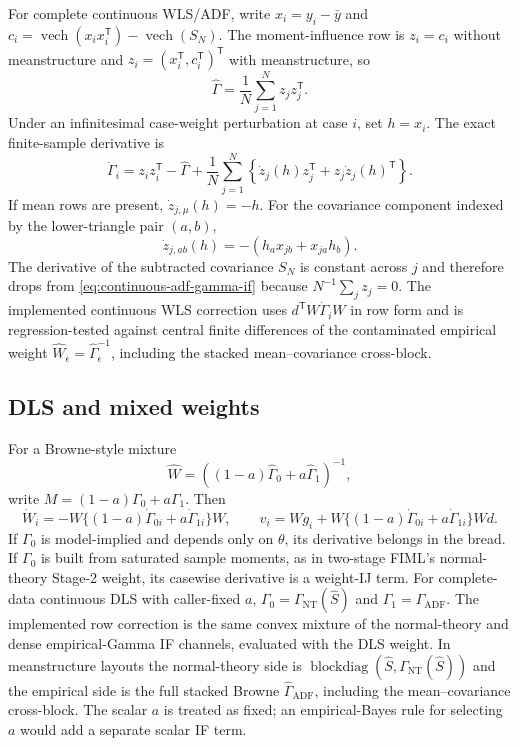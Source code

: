 \documentclass[11pt]{article}
\newcommand{\vech}{\operatorname{vech}}
\newcommand{\T}{^{\mathsf T}}
\theoremstyle{plain}
\theoremstyle{remark}
\begin{document}
For complete continuous WLS/ADF, write $x_i=y_i-\bar y$ and
$c_i=\vech(x_ix_i\T)-\vech(S_N)$. The moment-influence row is
$z_i=c_i$ without meanstructure and $z_i=(x_i\T,c_i\T)\T$ with
meanstructure, so
\[
  \hat\Gamma = \frac1N\sum_{j=1}^N z_jz_j\T .
\]
Under an infinitesimal case-weight perturbation at case $i$, set $h=x_i$.
The exact finite-sample derivative is
\begin{equation}\label{eq:continuous-adf-gamma-if}
  \dot\Gamma_i
  =
  z_i z_i\T - \hat\Gamma
  + \frac1N\sum_{j=1}^N
      \left\{\dot z_j(h) z_j\T + z_j\dot z_j(h)\T\right\}.
\end{equation}
If mean rows are present, $\dot z_{j,\mu}(h)=-h$. For the covariance
component indexed by the lower-triangle pair $(a,b)$,
\[
  \dot z_{j,ab}(h)=-(h_a x_{jb}+x_{ja}h_b).
\]
The derivative of the subtracted covariance $S_N$ is constant across $j$ and
therefore drops from \eqref{eq:continuous-adf-gamma-if} because
$N^{-1}\sum_j z_j=0$. The implemented continuous WLS correction uses
$d\T W\dot\Gamma_iW$ in row form and is regression-tested against central
finite differences of the contaminated empirical weight
$\hat W_\epsilon=\hat\Gamma_\epsilon^{-1}$, including the stacked
mean--covariance cross-block.

\subsection{DLS and mixed weights}

For a Browne-style mixture
\[
  \hat W = \left((1-a)\hat\Gamma_0 + a\hat\Gamma_1\right)^{-1},
\]
write $M=(1-a)\Gamma_0+a\Gamma_1$. Then
\[
  \dot W_i = -W\{(1-a)\dot\Gamma_{0i}+a\dot\Gamma_{1i}\}W,
  \qquad
  v_i = Wg_i + W\{(1-a)\dot\Gamma_{0i}+a\dot\Gamma_{1i}\}Wd .
\]
If $\Gamma_0$ is model-implied and depends only on $\theta$, its derivative
belongs in the bread. If $\Gamma_0$ is built from saturated sample moments, as
in two-stage FIML's normal-theory Stage-2 weight, its casewise derivative is a
weight-IJ term.
For complete-data continuous DLS with caller-fixed $a$,
$\Gamma_0=\Gamma_{\mathrm{NT}}(\hat S)$ and
$\Gamma_1=\hat\Gamma_{\mathrm{ADF}}$. The implemented row correction is the
same convex mixture of the normal-theory and dense empirical-Gamma IF channels,
evaluated with the DLS weight. In meanstructure layouts the normal-theory side
is $\operatorname{blockdiag}(\hat S,\Gamma_{\mathrm{NT}}(\hat S))$ and the
empirical side is the full stacked Browne $\hat\Gamma_{\mathrm{ADF}}$, including the
mean--covariance cross-block. The scalar $a$ is treated as fixed; an
empirical-Bayes rule for selecting $a$ would add a separate scalar IF term.
\end{document}
